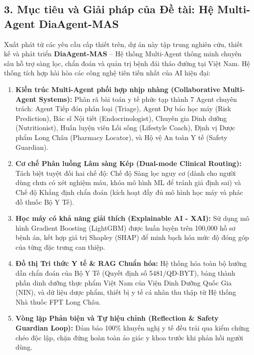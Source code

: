 \documentclass[12pt,a4paper]{article}
\begin{document}
\subsection*{3. Mục tiêu và Giải pháp của Đề tài: Hệ Multi-Agent DiaAgent-MAS}
Xuất phát từ các yêu cầu cấp thiết trên, dự án này tập trung nghiên cứu, thiết kế và phát triển \textbf{DiaAgent-MAS} -- Hệ thống Multi-Agent thông minh chuyên sâu hỗ trợ sàng lọc, chẩn đoán và quản trị bệnh đái tháo đường tại Việt Nam. Hệ thống tích hợp hài hòa các công nghệ tiên tiến nhất của AI hiện đại:
\begin{enumerate}[leftmargin=1.2cm]
    \item \textbf{Kiến trúc Multi-Agent phối hợp nhịp nhàng (Collaborative Multi-Agent Systems):} Phân rã bài toán y tế phức tạp thành 7 Agent chuyên trách: Agent Tiếp đón phân loại (Triage), Agent Dự báo học máy (Risk Prediction), Bác sĩ Nội tiết (Endocrinologist), Chuyên gia Dinh dưỡng (Nutritionist), Huấn luyện viên Lối sống (Lifestyle Coach), Định vị Dược phẩm Long Châu (Pharmacy Locator), và Hộ vệ An toàn Y tế (Safety Guardian).
    \item \textbf{Cơ chế Phân luồng Lâm sàng Kép (Dual-mode Clinical Routing):} Tách biệt tuyệt đối hai chế độ: Chế độ Sàng lọc nguy cơ (dành cho người dùng chưa có xét nghiệm máu, khóa mô hình ML để tránh giả định sai) và Chế độ Khẳng định chẩn đoán (kích hoạt đầy đủ mô hình học máy và phác đồ thuốc Bộ Y Tế).
    \item \textbf{Học máy có khả năng giải thích (Explainable AI - XAI):} Sử dụng mô hình Gradient Boosting (LightGBM) được huấn luyện trên 100,000 hồ sơ bệnh án, kết hợp giá trị Shapley (SHAP) để minh bạch hóa mức độ đóng góp của từng đặc trưng can thiệp.
    \item \textbf{Đồ thị Tri thức Y tế \& RAG Chuẩn hóa:} Hệ thống hóa toàn bộ hướng dẫn chẩn đoán của Bộ Y Tế (Quyết định số 5481/QĐ-BYT), bảng thành phần dinh dưỡng thực phẩm Việt Nam của Viện Dinh Dưỡng Quốc Gia (NIN), và dữ liệu dược phẩm, thiết bị y tế cá nhân thu thập từ Hệ thống Nhà thuốc FPT Long Châu.
    \item \textbf{Vòng lặp Phản biện và Tự hiệu chỉnh (Reflection \& Safety Guardian Loop):} Đảm bảo 100\% khuyến nghị y tế đều trải qua kiểm chứng chéo độc lập, chặn đứng hoàn toàn ảo giác y khoa trước khi phản hồi người dùng.
\end{enumerate}
\end{document}
